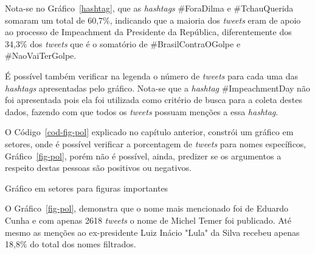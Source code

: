 Nota-se no Gráfico~\ref{hashtag}, que as \textit{hashtags} \#ForaDilma e \#TchauQuerida somaram um total de 60,7\%, indicando que a maioria dos \textit{tweets} eram de apoio ao processo de Impeachment da Presidente da República, diferentemente dos 34,3\% dos \textit{tweets} que é o somatório de \#BrasilContraOGolpe e \#NaoVaiTerGolpe.

É possível também verificar na legenda o número de \textit{tweets} para cada uma das \textit{hashtags} apresentadas pelo gráfico. Nota-se que a \textit{hashtag} \#ImpeachmentDay não foi apresentada pois ela foi utilizada como critério de busca para a coleta destes dados, fazendo com que todos os \textit{tweets} possuam menções a essa \textit{hashtag}.

O Código~\ref{cod-fig-pol} explicado no capítulo anterior, constrói um gráfico em setores, onde é possível verificar a porcentagem de \textit{tweets} para nomes específicos, Gráfico~\ref{fig-pol}, porém não é possível, ainda, predizer se os argumentos a respeito destas pessoas são positivos ou negativos.

\begin{grafico}[h]
	\centering
	\caption{Gráfico em setores para figuras importantes}
	\vspace{-0.3cm}
	\label{fig-pol}
\end{grafico}

O Gráfico~\ref{fig-pol}, demonstra que o nome mais mencionado foi de Eduardo Cunha e com apenas 2618 \textit{tweets} o nome de Michel Temer foi publicado. Até mesmo as menções ao ex-presidente Luiz Inácio "Lula" \space da Silva recebeu apenas 18,8\% do total dos nomes filtrados.

